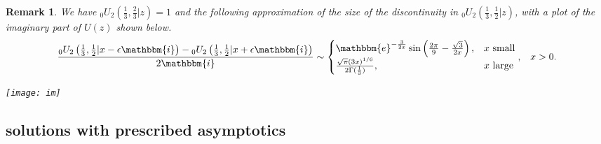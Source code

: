 \documentclass[12pt]{article}
\newcommand{\ee}[0] {\mathbbm{e}}
\newcommand{\ii}[0] {\mathbbm{i}}
\numberwithin{equation}{section}
\newtheorem{remark}[theorem]{Remark}
\newcommand{\FFf}[5] {{}_{#1}{#2}_{#3} \left(#4 | {#5} \right)}
\begin{document}
\begin{remark}
We have $\FFf{0}{U}{2}{\tfrac{1}{3},\tfrac{2}{3}}{z}=1$ and the following approximation of the size of the discontinuity in $\FFf{0}{U}{2}{\tfrac{1}{3},\tfrac{1}{2}}{z}$, with a plot of the imaginary part of $U(z)$ shown below.
\begin{equation*}
\frac{\FFf{0}{U}{2}{\tfrac{1}{3},\tfrac{1}{2}}{x-\epsilon \ii}-\FFf{0}{U}{2}{\tfrac{1}{3},\tfrac{1}{2}}{x+ \epsilon \ii}}{2\ii} \sim \begin{cases}
\ee^{-\frac{3}{2x}} \sin \left(\frac{2 \pi }{9}-\frac{\sqrt{3}}{2 x}\right)\text{,} & x \text{ small}\\
\frac{\sqrt{\pi} (3x)^{1/6}}{2\Gamma(\frac13)} \text{,} & x \text{ large}
\end{cases}\text{,} \quad x > 0.
\end{equation*}
\begin{center}
\texttt{[image: im]}
\end{center}
\end{remark}

\subsection{solutions with prescribed asymptotics}
\end{document}
